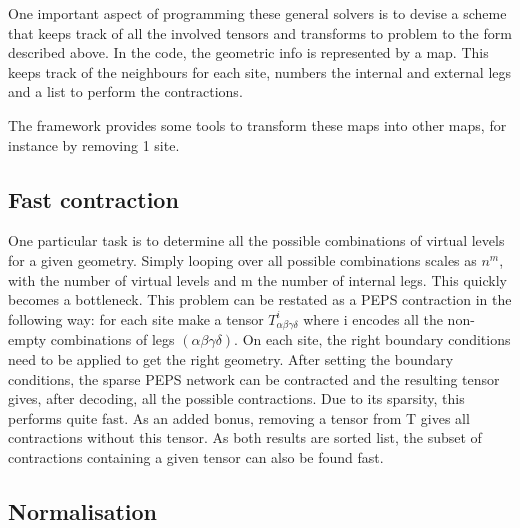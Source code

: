 One important aspect of programming these general solvers is to devise a scheme that keeps track of all the involved tensors and transforms to problem to the form described above. In the code, the geometric info is represented by a map. This keeps track of the neighbours for each site, numbers the internal and external legs and a list to perform the contractions.

The framework provides some tools to transform these maps into other maps, for instance by removing 1 site.

\subsection{Fast contraction}

One particular task is to determine all the possible combinations of virtual levels for a given geometry. Simply looping over all possible combinations scales as $n^m$, with the number of virtual levels and m the number of internal legs. This quickly becomes a bottleneck.
This problem can be restated as a PEPS contraction in the following way: for each site make a tensor $ T^{i}_{  \alpha \beta \gamma \delta } $ where i encodes all the non-empty combinations of legs $(\alpha \beta \gamma \delta)$. On each site, the right boundary conditions need to be applied to get the right geometry. After setting the boundary conditions, the sparse PEPS network can be contracted and the resulting tensor gives, after decoding, all the possible contractions. Due to its sparsity, this performs quite fast.
As an added bonus, removing a tensor from T gives all contractions without this tensor. As both results are sorted list, the subset of contractions containing a given tensor can also be found fast.

\subsection{Normalisation}\label{subsec:nf}

